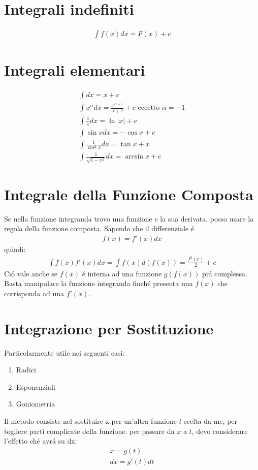 \documentclass{article}
\title{\jobname}
\author{Eugenio Animali}
\begin{document}
\maketitle

\section{Integrali indefiniti}

\begin{gather*}
    \int f(x)dx = F(x) + c
\end{gather*}
\section{Integrali elementari}
\begin{gather*}
    \int dx = x + c\\
    \int x^\alpha dx = \frac{x^{\alpha + 1}}{\alpha + 1} + c \text{ eccetto } \alpha = - 1\\
    \int \frac{1}{x} dx = \ln |x| + c\\
    \int \sin x dx = - \cos x + c\\
    \int \frac{1}{\cos^2 x}dx = \tan x + x\\
    \int \frac{1}{\sqrt{1 - x^2}} dx = \arcsin x + c
\end{gather*}

\section{Integrale della Funzione Composta}
Se nella funzione integranda trovo una funzione e la sua derivata, posso usare la regola della funzione composta.
Sapendo che il differenziale é
\begin{gather*}
    f(x) = f'(x) dx
\end{gather*}
quindi:
\begin{gather*}
    \int f(x) f'(x) dx = \int f(x) d(f(x)) = \frac{f^2(x)}{2} + c
\end{gather*}
Ció vale anche se $f(x)$ é interna ad una funzione $g(f(x))$ piú complessa. Basta manipolare la funzione integranda finché presenta una $f(x)$ che corrisponda ad una $f'(x)$.
\section{Integrazione per Sostituzione}
Particolarmente utile nei seguenti casi:
\begin{enumerate}
    \item Radici
    \item Esponenziali
    \item Goniometria
\end{enumerate}
Il metodo consiste nel sostituire x per un'altra funzione $t$ scelta da me, per togliere parti complicate della funzione. per passare da $x$ a $t$, devo considerare l'effetto ché avrá su dx:
\begin{gather*}
    x = g(t)\\
    dx = g'(t)dt
\end{gather*}
\end{document}
